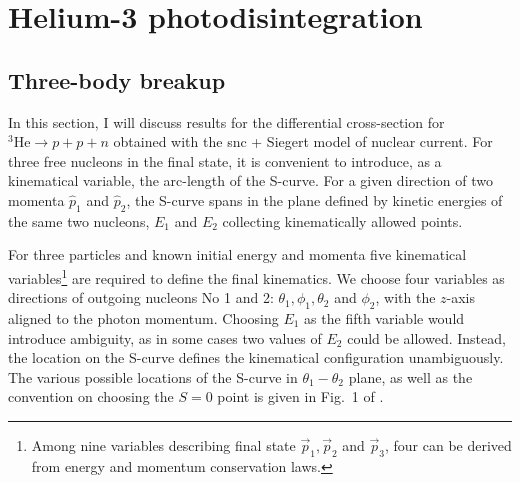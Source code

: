\clearpage

\section{Helium-3 photodisintegration}
\label{sec:hel_results}

\subsection{Three-body breakup}
\label{sec:hel_3N}

    In this section, I will discuss results
    for the differential cross-section for $^3\text{He} \rightarrow p + p + n$
    obtained with the \gls{snc} + Siegert model of nuclear current.
    For three free nucleons in the final state, it is convenient to
    introduce, as a kinematical variable, the arc-length of the S-curve.
    For a given direction of two momenta $\hat{p}_1$ and $\hat{p}_2$,
    the S-curve spans in the plane defined by kinetic energies of the 
    same two nucleons, $E_1$ and $E_2$ collecting kinematically allowed points.

    For three particles and known initial energy and momenta five kinematical
    variables\footnote{Among nine variables describing final state 
    $\vec{p}_1,\vec{p}_2$ and $\vec{p}_3$, four can be derived from 
    energy and momentum conservation laws.}
    are required to define the final kinematics.
    We choose four variables as directions of outgoing nucleons No 1 and 2:
    $\theta_1, \phi_1, \theta_2$ and $\phi_2$, with the $z$-axis aligned to the 
    photon momentum. Choosing $E_1$ as the fifth variable would introduce
    ambiguity, as in some cases two values of $E_2$ could be allowed.
    Instead, the location on the S-curve defines the kinematical configuration
    unambiguously.
    The various possible locations of the S-curve in $\theta_1-\theta_2$ plane,
    as well as the convention on choosing the $S=0$ point is given
    in Fig.~1 of \cite{GLOCKLE_report_1996}.
    
